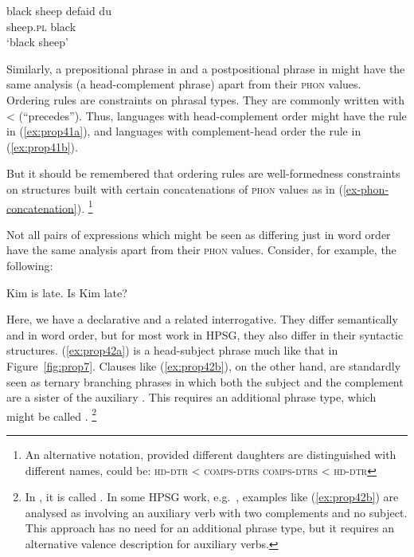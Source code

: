 \documentclass[output=paper
	        ,collection
	        ,collectionchapter
 	        ,biblatex
                ,babelshorthands
                ,newtxmath
                ,draftmode
                ,colorlinks, citecolor=brown
]{langscibook}
\begin{document}
\eal\label{ex:prop40}
\ex\label{ex:prop40a}
black sheep
\ex\label{ex:prop40b}
\gll defaid            du\\
     sheep.\textsc{pl} black\\
\glt `black sheep'
\zl

\noindent
Similarly, a prepositional phrase in  and a postpositional phrase in  might have the same analysis (a head-complement phrase) apart from their \textsc{phon} values. Ordering rules are constraints on phrasal types. They are commonly written with < (``precedes''). Thus, languages with head-complement order might have the rule in (\ref{ex:prop41a}), and languages with complement-head order the rule in (\ref{ex:prop41b}).

\eal\label{ex:prop41}
\ex\label{ex:prop41a}
\ex\label{ex:prop41b}
\zl
%
But it should be remembered that ordering rules are well-formedness constraints on structures built with certain concatenations of \textsc{phon} values as in (\ref{ex-phon-concatenation}).%
%
\footnote{An alternative notation, provided different daughters are distinguished with different names, could be:
\eal
\ex \textsc{hd-dtr} < \textsc{comps-dtrs}
\ex \textsc{comps-dtrs} < \textsc{hd-dtr}
\zllast
}
%

Not all pairs of expressions which might be seen as differing just in word order have the same analysis apart from their \textsc{phon} values. Consider, for example, the following:

\eal\label{ex:prop42}
\ex\label{ex:prop42a}
Kim is late.
\ex\label{ex:prop42b}
Is Kim late?
\zl

\noindent
Here, we have a declarative and a related interrogative. They differ semantically and in word order, but for most work in HPSG, they also differ in their syntactic structures. (\ref{ex:prop42a}) is a head-subject phrase much like that in Figure~\ref{fig:prop7}. Clauses like (\ref{ex:prop42b}), on the other hand, are standardly seen as ternary branching phrases in which both the subject and the complement are a sister of the auxiliary \citep[40]{ps2}. This requires an additional phrase type, which might be called .%
%
\footnote{In \citet[36]{GSag2000a-u}, it is called . In some HPSG work, e.g.\ \citet[409--414]{SWB2003a}, examples like (\ref{ex:prop42b}) are analysed as involving an auxiliary verb with two complements and no subject. This approach has no need for an additional phrase type, but it requires an alternative valence description for auxiliary verbs.}
%
\end{document}

